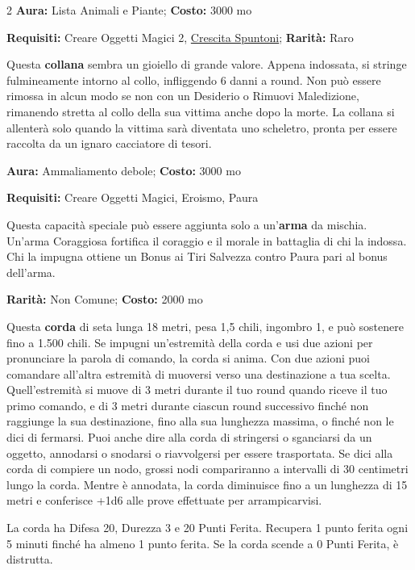 \begin{multicols}{2}
\textbf{Aura:} Lista Animali e Piante; \textbf{Costo:} 3000 mo

\textbf{Requisiti:} Creare Oggetti Magici 2, \hyperlink{Crescita di Spuntoni}{Crescita Spuntoni}; \textbf{Rarità:} Raro

Questa \textbf{collana} sembra un gioiello di grande valore. Appena indossata, si stringe fulmineamente intorno al collo, infliggendo 6 danni a round. Non può essere rimossa in alcun modo se non con un Desiderio o Rimuovi Maledizione, rimanendo stretta al collo della sua vittima anche dopo la morte. La collana si allenterà solo quando la vittima sarà diventata uno scheletro, pronta per essere raccolta da un ignaro cacciatore di tesori.


\textbf{Aura:} Ammaliamento debole; \textbf{Costo:} 3000 mo

\textbf{Requisiti:} Creare Oggetti Magici, Eroismo, Paura

Questa capacità speciale può essere aggiunta solo a un'\textbf{arma} da mischia. Un'arma Coraggiosa fortifica il coraggio e il morale in battaglia di chi la indossa. Chi la impugna ottiene un Bonus ai Tiri Salvezza contro Paura pari al bonus dell'arma.


\textbf{Rarità:} Non Comune; \textbf{Costo:} 2000 mo

Questa \textbf{corda} di seta lunga 18 metri, pesa 1,5 chili, ingombro 1, e può sostenere fino a 1.500 chili. Se impugni un'estremità della corda e usi due azioni per pronunciare la parola di comando, la corda si anima. Con due azioni puoi comandare all'altra estremità di muoversi verso una destinazione a tua scelta. Quell'estremità si muove di 3 metri durante il tuo round quando riceve il tuo primo comando, e di 3 metri durante ciascun round successivo finché non raggiunge la sua destinazione, fino alla sua lunghezza massima, o finché non le dici di fermarsi. Puoi anche dire alla corda di stringersi o sganciarsi da un oggetto, annodarsi o snodarsi o riavvolgersi per essere trasportata. Se dici alla corda di compiere un nodo, grossi nodi compariranno a intervalli di 30 centimetri lungo la corda. Mentre è annodata, la corda diminuisce fino a un lunghezza di 15 metri e conferisce +1d6 alle prove effettuate per arrampicarvisi.

La corda ha Difesa 20, Durezza 3 e 20 Punti Ferita. Recupera 1 punto ferita ogni 5 minuti finché ha almeno 1 punto ferita. Se la corda scende a 0 Punti Ferita, è distrutta.


\end{multicols}
